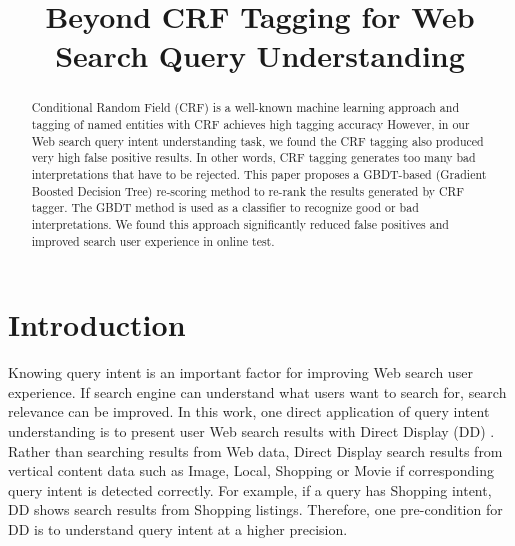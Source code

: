 \documentclass{acm_proc_article-sp}
\begin{document}
\title{Beyond CRF Tagging for Web Search Query Understanding}


\maketitle

\begin{abstract}
Conditional Random Field (CRF) is a well-known machine learning approach and tagging of named entities with CRF achieves high tagging accuracy
However, in our Web search query intent understanding task, we found the CRF tagging also produced very high false positive results. In other words, CRF tagging generates too many bad interpretations that have to be rejected. This paper proposes a GBDT-based (Gradient Boosted Decision Tree) re-scoring method to re-rank the results generated by CRF tagger. The GBDT method is used as a classifier to recognize good or bad interpretations. We found this approach significantly reduced false positives and improved search user experience in online test. 
\end{abstract}



\section{Introduction}
Knowing query intent is an important factor for improving Web search user experience. If search engine can understand what users want to search for, search relevance can be improved.  In this work, one direct application of query intent understanding is to present user Web search results with Direct Display (DD) .  Rather than searching results from Web data, Direct Display search results from vertical content data such as Image, Local, Shopping or Movie if corresponding query intent is detected correctly. For example, if a query has Shopping intent, DD shows search results from Shopping listings.  Therefore, one pre-condition for DD is to understand query intent at a higher precision.
\end{document}
